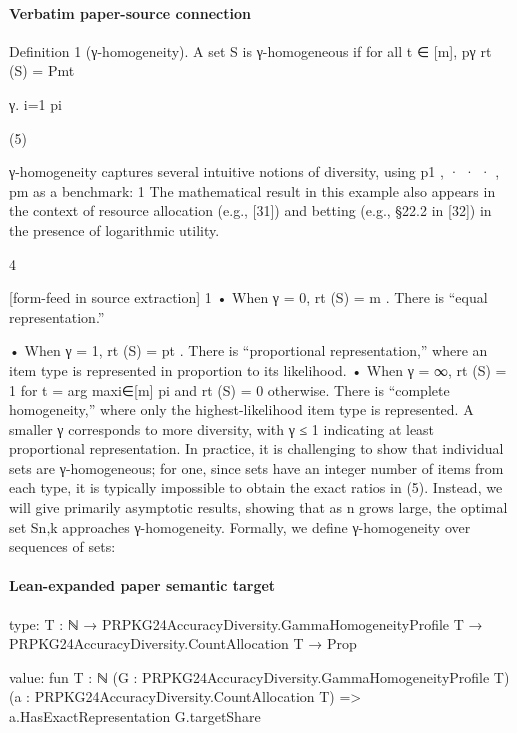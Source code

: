 \documentclass[10pt]{article}
\begin{document}
\paragraph{Verbatim paper-source connection}
\begin{ReviewVerbatim}
Definition 1 (γ-homogeneity). A set S is γ-homogeneous if for all t ∈ [m],
pγ
rt (S) = Pmt

γ.
i=1 pi

(5)

γ-homogeneity captures several intuitive notions of diversity, using p1 , · · · , pm as a benchmark:
1 The mathematical result in this example also appears in the context of resource allocation (e.g., [31]) and betting (e.g.,
§22.2 in [32]) in the presence of logarithmic utility.

4


[form-feed in source extraction]
1
• When γ = 0, rt (S) = m
. There is “equal representation.”

• When γ = 1, rt (S) = pt . There is “proportional representation,” where an item type is represented in
proportion to its likelihood.
• When γ = ∞, rt (S) = 1 for t = arg maxi∈[m] pi and rt (S) = 0 otherwise. There is “complete homogeneity,”
where only the highest-likelihood item type is represented.
A smaller γ corresponds to more diversity, with γ ≤ 1 indicating at least proportional representation. In
practice, it is challenging to show that individual sets are γ-homogeneous; for one, since sets have an integer
number of items from each type, it is typically impossible to obtain the exact ratios in (5). Instead, we will give
primarily asymptotic results, showing that as n grows large, the optimal set Sn,k approaches γ-homogeneity.
Formally, we define γ-homogeneity over sequences of sets:
\end{ReviewVerbatim}



\paragraph{Lean-expanded paper semantic target}
\begin{ReviewVerbatim}
type:
{T : ℕ} → PRPKG24AccuracyDiversity.GammaHomogeneityProfile T → PRPKG24AccuracyDiversity.CountAllocation T → Prop

value:
fun {T : ℕ} (G : PRPKG24AccuracyDiversity.GammaHomogeneityProfile T) (a : PRPKG24AccuracyDiversity.CountAllocation T) =>
  a.HasExactRepresentation G.targetShare
\end{ReviewVerbatim}
\end{document}
